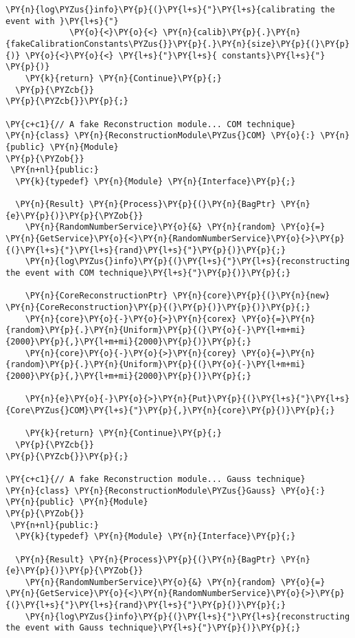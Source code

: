 \begin{Verbatim}[commandchars=\\\{\}]
    \PY{n}{log\PYZus{}info}\PY{p}{(}\PY{l+s}{"}\PY{l+s}{calibrating the event with }\PY{l+s}{"}
             \PY{o}{<}\PY{o}{<} \PY{n}{calib}\PY{p}{.}\PY{n}{fakeCalibrationConstants\PYZus{}}\PY{p}{.}\PY{n}{size}\PY{p}{(}\PY{p}{)} \PY{o}{<}\PY{o}{<} \PY{l+s}{"}\PY{l+s}{ constants}\PY{l+s}{"} \PY{p}{)}
    \PY{k}{return} \PY{n}{Continue}\PY{p}{;}
  \PY{p}{\PYZcb{}}
\PY{p}{\PYZcb{}}\PY{p}{;}

\PY{c+c1}{// A fake Reconstruction module... COM technique}
\PY{n}{class} \PY{n}{ReconstructionModule\PYZus{}COM} \PY{o}{:} \PY{n}{public} \PY{n}{Module}
\PY{p}{\PYZob{}}
 \PY{n+nl}{public:}
  \PY{k}{typedef} \PY{n}{Module} \PY{n}{Interface}\PY{p}{;}

  \PY{n}{Result} \PY{n}{Process}\PY{p}{(}\PY{n}{BagPtr} \PY{n}{e}\PY{p}{)}\PY{p}{\PYZob{}}
    \PY{n}{RandomNumberService}\PY{o}{&} \PY{n}{random} \PY{o}{=} \PY{n}{GetService}\PY{o}{<}\PY{n}{RandomNumberService}\PY{o}{>}\PY{p}{(}\PY{l+s}{"}\PY{l+s}{rand}\PY{l+s}{"}\PY{p}{)}\PY{p}{;} 
    \PY{n}{log\PYZus{}info}\PY{p}{(}\PY{l+s}{"}\PY{l+s}{reconstructing the event with COM technique}\PY{l+s}{"}\PY{p}{)}\PY{p}{;} 

    \PY{n}{CoreReconstructionPtr} \PY{n}{core}\PY{p}{(}\PY{n}{new} \PY{n}{CoreReconstruction}\PY{p}{(}\PY{p}{)}\PY{p}{)}\PY{p}{;}
    \PY{n}{core}\PY{o}{-}\PY{o}{>}\PY{n}{corex} \PY{o}{=}\PY{n}{random}\PY{p}{.}\PY{n}{Uniform}\PY{p}{(}\PY{o}{-}\PY{l+m+mi}{2000}\PY{p}{,}\PY{l+m+mi}{2000}\PY{p}{)}\PY{p}{;} 
    \PY{n}{core}\PY{o}{-}\PY{o}{>}\PY{n}{corey} \PY{o}{=}\PY{n}{random}\PY{p}{.}\PY{n}{Uniform}\PY{p}{(}\PY{o}{-}\PY{l+m+mi}{2000}\PY{p}{,}\PY{l+m+mi}{2000}\PY{p}{)}\PY{p}{;} 

    \PY{n}{e}\PY{o}{-}\PY{o}{>}\PY{n}{Put}\PY{p}{(}\PY{l+s}{"}\PY{l+s}{Core\PYZus{}COM}\PY{l+s}{"}\PY{p}{,}\PY{n}{core}\PY{p}{)}\PY{p}{;}
    
    \PY{k}{return} \PY{n}{Continue}\PY{p}{;}
  \PY{p}{\PYZcb{}}
\PY{p}{\PYZcb{}}\PY{p}{;}

\PY{c+c1}{// A fake Reconstruction module... Gauss technique}
\PY{n}{class} \PY{n}{ReconstructionModule\PYZus{}Gauss} \PY{o}{:} \PY{n}{public} \PY{n}{Module}
\PY{p}{\PYZob{}}
 \PY{n+nl}{public:}
  \PY{k}{typedef} \PY{n}{Module} \PY{n}{Interface}\PY{p}{;}

  \PY{n}{Result} \PY{n}{Process}\PY{p}{(}\PY{n}{BagPtr} \PY{n}{e}\PY{p}{)}\PY{p}{\PYZob{}}
    \PY{n}{RandomNumberService}\PY{o}{&} \PY{n}{random} \PY{o}{=} \PY{n}{GetService}\PY{o}{<}\PY{n}{RandomNumberService}\PY{o}{>}\PY{p}{(}\PY{l+s}{"}\PY{l+s}{rand}\PY{l+s}{"}\PY{p}{)}\PY{p}{;} 
    \PY{n}{log\PYZus{}info}\PY{p}{(}\PY{l+s}{"}\PY{l+s}{reconstructing the event with Gauss technique}\PY{l+s}{"}\PY{p}{)}\PY{p}{;} 


\end{Verbatim}

